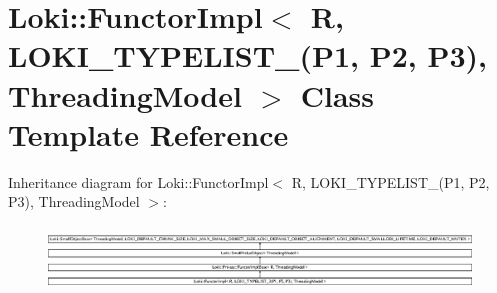 \hypertarget{classLoki_1_1FunctorImpl_3_01R_00_01LOKI__TYPELIST__3_07P1_00_01P2_00_01P3_08_00_01ThreadingModel_01_4}{}\section{Loki\+:\+:Functor\+Impl$<$ R, L\+O\+K\+I\+\_\+\+T\+Y\+P\+E\+L\+I\+S\+T\+\_(P1, P2, P3), Threading\+Model $>$ Class Template Reference}
\label{classLoki_1_1FunctorImpl_3_01R_00_01LOKI__TYPELIST__3_07P1_00_01P2_00_01P3_08_00_01ThreadingModel_01_4}
Inheritance diagram for Loki\+:\+:Functor\+Impl$<$ R, L\+O\+K\+I\+\_\+\+T\+Y\+P\+E\+L\+I\+S\+T\+\_(P1, P2, P3), Threading\+Model $>$\+:\begin{figure}[H]
\begin{center}
\leavevmode
\includegraphics[height=1.751368cm]{classLoki_1_1FunctorImpl_3_01R_00_01LOKI__TYPELIST__3_07P1_00_01P2_00_01P3_08_00_01ThreadingModel_01_4}
\end{center}
\end{figure}
